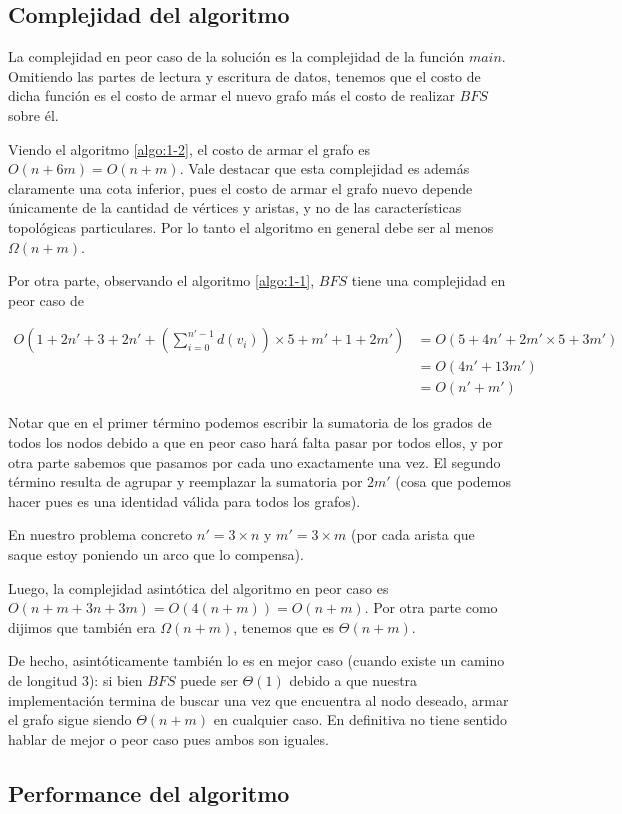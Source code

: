 \subsection{Complejidad del algoritmo}
La complejidad en peor caso de la solución es la complejidad de la función $main$. Omitiendo las partes de lectura y escritura de datos, tenemos que el costo de dicha función es el costo de armar el nuevo grafo más el costo de realizar $BFS$ sobre él.

Viendo el algoritmo \ref{algo:1-2}, el costo de armar el grafo es $O(n+6m) = O(n+m)$. Vale destacar que esta complejidad es además claramente una cota inferior, pues el costo de armar el grafo nuevo depende únicamente de la cantidad de vértices y aristas, y no de las características topológicas particulares. Por lo tanto el algoritmo en general debe ser al menos $\Omega(n+m)$.

Por otra parte, observando el algoritmo \ref{algo:1-1}, $BFS$ tiene una complejidad en peor caso de 

\begin{equation}
\begin{aligned}
	O(1+2n'+3+2n'+(\sum_{i=0}^{n'-1}d(v_{i}))\times 5 + m' + 1 + 2m') & = O(5+4n'+2m'\times 5 + 3m') \\
	&= O(4n'+13m') \\
	&= O(n'+m')
\end{aligned}
\end{equation}

Notar que en el primer término podemos escribir la sumatoria de los grados de todos los nodos debido a que en peor caso hará falta pasar por todos ellos, y por otra parte sabemos que pasamos por cada uno exactamente una vez. El segundo término resulta de agrupar y reemplazar la sumatoria por $2m'$ (cosa que podemos hacer pues es una identidad válida para todos los grafos).

En nuestro problema concreto $n'=3\times n$ y $m' = 3\times m$ (por cada arista que saque estoy poniendo un arco que lo compensa).

Luego, la complejidad asintótica del algoritmo en peor caso es $O(n+m+3n+3m) = O(4(n+m)) = O(n+m)$. Por otra parte como dijimos que también era $\Omega(n+m)$, tenemos que es $\Theta(n+m)$.

De hecho, asintóticamente también lo es en mejor caso (cuando existe un camino de longitud 3): si bien $BFS$ puede ser $\Theta(1)$ debido a que nuestra implementación termina de buscar una vez que encuentra al nodo deseado, armar el grafo sigue siendo $\Theta(n+m)$ en cualquier caso. En definitiva no tiene sentido hablar de mejor o peor caso pues ambos son iguales.

\subsection{Performance del algoritmo}


